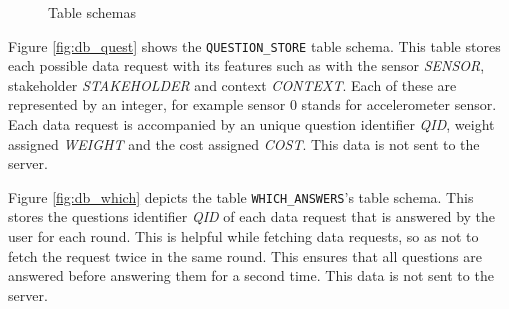 \begin{figure}[htp]
\hspace{1em}
\caption{Table schemas}
\label{fig:ts1}
\end{figure}

Figure \ref{fig:db_quest} shows the \texttt{QUESTION\_STORE} table schema. This table stores each possible data request with its features such as with the sensor \textit{SENSOR}, stakeholder \textit{STAKEHOLDER} and context \textit{CONTEXT}. Each of these are represented by an integer, for example sensor 0 stands for accelerometer sensor. Each data request is accompanied by
an unique question identifier \textit{QID}, weight assigned \textit{WEIGHT} and the cost assigned \textit{COST}. This data is not sent to 
the server.

Figure \ref{fig:db_which} depicts the table \texttt{WHICH\_ANSWERS}'s table schema. This stores the questions identifier \textit{QID} of each data request that is answered by the user for each round. This is helpful while fetching data requests, so as not to fetch the request twice in the same round. This ensures that all questions are answered before answering them for a second time. This data is not sent to the server.

